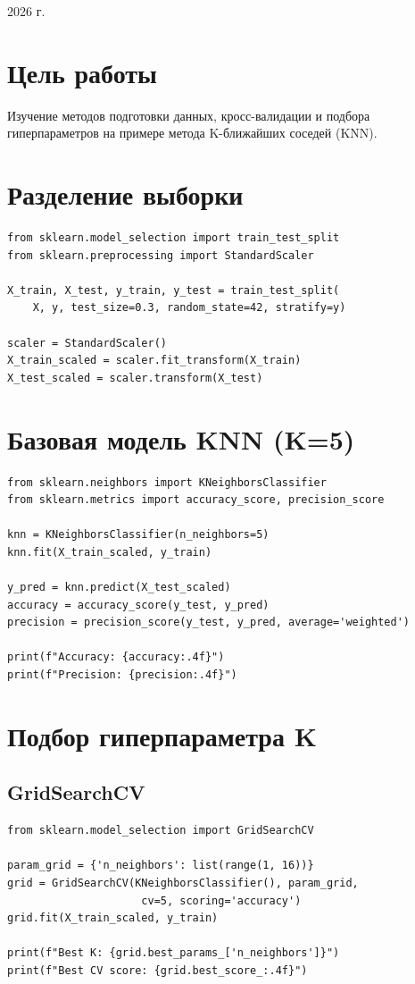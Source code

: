 \documentclass[a4paper,12pt]{article}
\begin{document}
\vfill
\begin{center}
    \large 2026 г.
\end{center}

\newpage

\pagestyle{plain}

\section*{Цель работы}
Изучение методов подготовки данных, кросс-валидации и подбора гиперпараметров на примере метода K-ближайших соседей (KNN).

\section*{Разделение выборки}

\begin{lstlisting}
from sklearn.model_selection import train_test_split
from sklearn.preprocessing import StandardScaler

X_train, X_test, y_train, y_test = train_test_split(
    X, y, test_size=0.3, random_state=42, stratify=y)

scaler = StandardScaler()
X_train_scaled = scaler.fit_transform(X_train)
X_test_scaled = scaler.transform(X_test)
\end{lstlisting}

\section*{Базовая модель KNN (K=5)}

\begin{lstlisting}
from sklearn.neighbors import KNeighborsClassifier
from sklearn.metrics import accuracy_score, precision_score

knn = KNeighborsClassifier(n_neighbors=5)
knn.fit(X_train_scaled, y_train)

y_pred = knn.predict(X_test_scaled)
accuracy = accuracy_score(y_test, y_pred)
precision = precision_score(y_test, y_pred, average='weighted')

print(f"Accuracy: {accuracy:.4f}")
print(f"Precision: {precision:.4f}")
\end{lstlisting}

\section*{Подбор гиперпараметра K}

\subsection*{GridSearchCV}
\begin{lstlisting}
from sklearn.model_selection import GridSearchCV

param_grid = {'n_neighbors': list(range(1, 16))}
grid = GridSearchCV(KNeighborsClassifier(), param_grid, 
                     cv=5, scoring='accuracy')
grid.fit(X_train_scaled, y_train)

print(f"Best K: {grid.best_params_['n_neighbors']}")
print(f"Best CV score: {grid.best_score_:.4f}")
\end{lstlisting}
\end{document}
